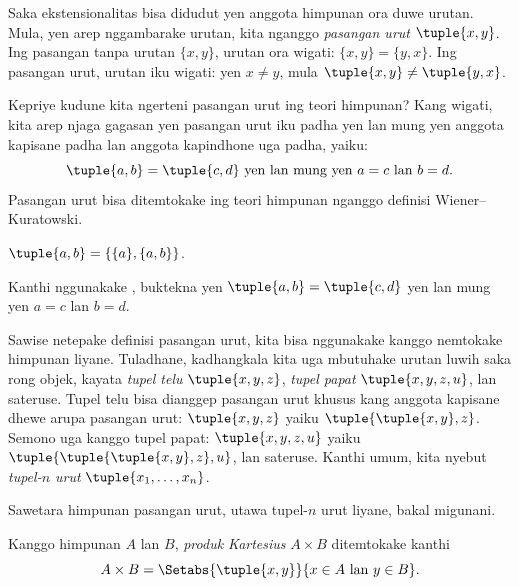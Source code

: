 \documentclass[../../../include/open-logic-section]{subfiles}
\begin{document}

\begin{explain}
Saka ekstensionalitas bisa didudut yen anggota himpunan ora
duwe urutan. Mula, yen arep nggambarake urutan, kita nganggo
\emph{pasangan urut} $\tuple{x, y}$. Ing pasangan tanpa urutan
$\{x, y\}$, urutan ora wigati: $\{x, y\} = \{y, x\}$.
Ing pasangan urut, urutan iku wigati: yen $x
\neq y$, mula $\tuple{x, y} \neq \tuple{y, x}$.

Kepriye kudune kita ngerteni pasangan urut ing teori himpunan?
Kang wigati, kita arep njaga gagasan yen pasangan urut iku padha
yen lan mung yen anggota kapisane padha lan anggota kapindhone
uga padha, yaiku:
\[
  \tuple{a, b}= \tuple{c, d}\text{ yen lan mung yen }a = c \text{ lan }b=d.
\]
Pasangan urut bisa ditemtokake ing teori himpunan nganggo
definisi Wiener--Kuratowski.
\end{explain}

\begin{defn}
	$\tuple{a, b} = \{\{a\}, \{a, b\}\}$.
\end{defn}

\begin{prob}
	Kanthi nggunakake ,
	buktekna yen $\tuple{a,b}= \tuple{c, d}$ yen lan mung yen
	$a = c$ lan $b=d$.
\end{prob}

\begin{explain}
Sawise netepake definisi pasangan urut, kita bisa nggunakake
kanggo nemtokake himpunan liyane. Tuladhane, kadhangkala kita
uga mbutuhake urutan luwih saka rong objek, kayata
\emph{tupel telu} $\tuple{x, y, z}$,
\emph{tupel papat} $\tuple{x, y, z, u}$, lan sateruse.
Tupel telu bisa dianggep pasangan urut khusus kang anggota
kapisane dhewe arupa pasangan urut:
$\tuple{x, y, z}$ yaiku $\tuple{\tuple{x, y},z}$.
Semono uga kanggo tupel papat: $\tuple{x,y,z,u}$ yaiku
$\tuple{\tuple{\tuple{x,y},z},u}$, lan sateruse.
Kanthi umum, kita nyebut \emph{tupel-$n$ urut}
$\tuple{x_1, \dots, x_n}$.

Sawetara himpunan pasangan urut, utawa tupel-$n$ urut liyane,
bakal migunani.
\end{explain}

\begin{defn}
Kanggo himpunan $A$ lan $B$, \emph{produk Kartesius}
$A \times B$ ditemtokake kanthi
\[
  A \times B = \Setabs{\tuple{x, y}}{x \in A \text{ lan } y \in B}.
\]
\end{defn}
\end{document}
